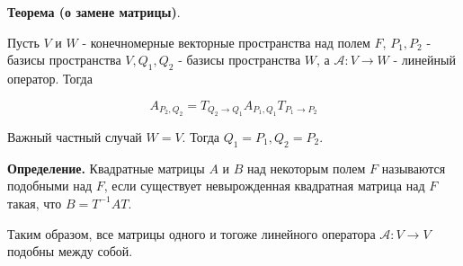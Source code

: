 \documentclass[a4paper]{article}
\begin{document}
\begin{htheorem}\textbf{Теорема (о замене матрицы)}.

Пусть $V$ и $W$ - конечномерные векторные пространства над полем $F$, $P_1, P_2$ - базисы пространства $V, Q_1, Q_2$ - базисы пространства $W$, а $\mathcal{A}: V \rightarrow W$ - линейный оператор. Тогда 

\[
A_{P_2, Q_2} = T_{Q_2 \rightarrow Q_1} A_{P_1,Q_1} T_{P_1 \rightarrow P_2}
\]

Важный частный случай $W=V$. Тогда $Q_1 = P_1, Q_2=P_2$.
\end{htheorem}

\textbf{Определение.} Квадратные матрицы $A$ и $B$ над некоторым полем $F$ называются подобными над $F$, если существует невырожденная квадратная матрица над $F$ такая, что $B = T^{-1}AT$.

Таким образом, все матрицы одного и тогоже линейного оператора $\mathcal{A}: V \rightarrow V$ подобны между собой.
\end{document}

